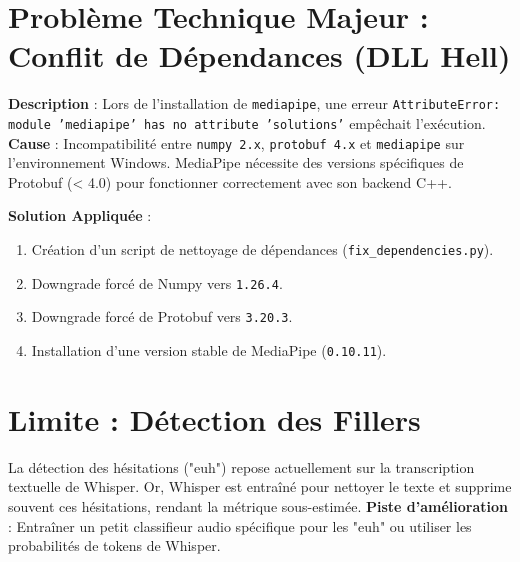 \section{Problème Technique Majeur : Conflit de Dépendances (DLL Hell)}
\textbf{Description} : Lors de l'installation de \texttt{mediapipe}, une erreur \texttt{AttributeError: module 'mediapipe' has no attribute 'solutions'} empêchait l'exécution.
\textbf{Cause} : Incompatibilité entre \texttt{numpy 2.x}, \texttt{protobuf 4.x} et \texttt{mediapipe} sur l'environnement Windows. MediaPipe nécessite des versions spécifiques de Protobuf (< 4.0) pour fonctionner correctement avec son backend C++.

\textbf{Solution Appliquée} :
\begin{enumerate}
    \item Création d'un script de nettoyage de dépendances (\texttt{fix\_dependencies.py}).
    \item Downgrade forcé de Numpy vers \texttt{1.26.4}.
    \item Downgrade forcé de Protobuf vers \texttt{3.20.3}.
    \item Installation d'une version stable de MediaPipe (\texttt{0.10.11}).
\end{enumerate}

\section{Limite : Détection des Fillers}
La détection des hésitations ("euh") repose actuellement sur la transcription textuelle de Whisper. Or, Whisper est entraîné pour nettoyer le texte et supprime souvent ces hésitations, rendant la métrique sous-estimée.
\textbf{Piste d'amélioration} : Entraîner un petit classifieur audio spécifique pour les "euh" ou utiliser les probabilités de tokens de Whisper.
